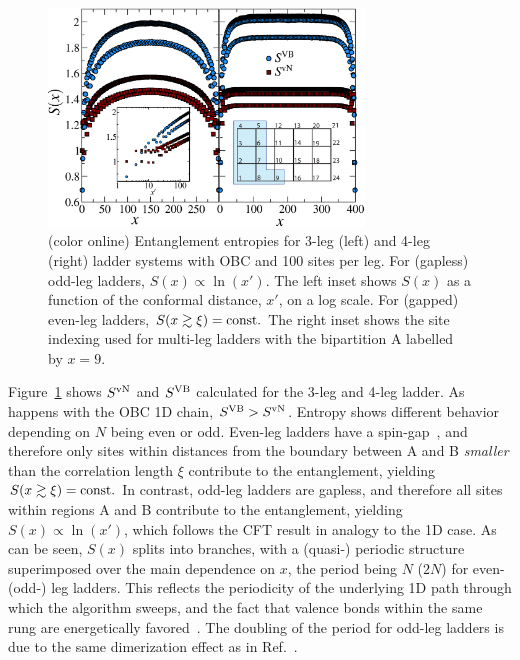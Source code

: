 \documentclass[prl,aps,twocolumn,floatfix,amsmath,amssymb,superscriptaddress,tightenlines]{revtex4}
\begin{document}
\begin{figure} { \includegraphics[width=3.3in]{FIG23NEW.eps}
\caption{(color online) Entanglement entropies for 3-leg (left)
and 4-leg (right) ladder systems with OBC and 100 sites per leg.  For
(gapless) odd-leg ladders, $S(x)\propto\ln(x')$.  The left
inset shows $S(x)$ as a function of the conformal distance, $x'$, on a log
scale. For (gapped) even-leg ladders, $S(x\gtrsim\xi)= {\rm const}.$
The right inset shows the site indexing used for multi-leg ladders with the
bipartition A labelled by $x=9$.  \label{ladder} }} \end{figure}

Figure~\ref{ladder} shows $S^{ \rm vN}$ and $S^{\rm VB}$ calculated
for the 3-leg and 4-leg ladder. As happens with the OBC 1D chain, $S^{\rm VB} > S^{ \rm vN}$.  
Entropy shows different behavior depending on
$N$ being even or odd.  Even-leg ladders have a
spin-gap~\cite{White1994}, and therefore only sites within distances from
the boundary between A and B {\it smaller} than the correlation length
$\xi$ contribute to the entanglement, yielding $S(x\gtrsim \xi)= {\rm
const}.$ In contrast, odd-leg ladders are gapless, and therefore all
sites within regions A and B contribute to the entanglement, 
yielding $S(x)\propto\ln(x')$, 
which follows the CFT result in
analogy to the 1D case. As can be seen, $S(x)$ splits into branches, with a
(quasi-) periodic structure superimposed over the main dependence on $x$,
the period being $N$ ($2N$) for even- (odd-) leg ladders. This reflects the
periodicity of the underlying 1D path through which the algorithm sweeps, and the fact that
valence bonds within the same rung are energetically
favored~\cite{White1994}. The doubling of the period for odd-leg ladders
is due to the same dimerization effect as in Ref.~\cite{Ian1}.
\end{document}
